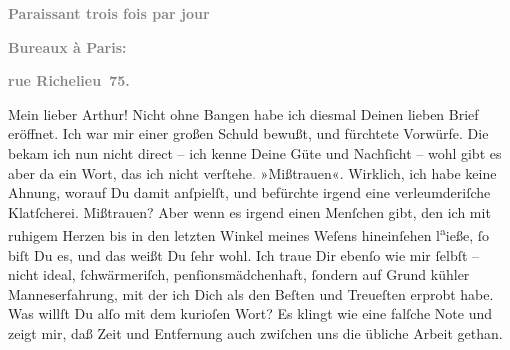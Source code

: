 \pstart
           \begin{otherlanguage}{french}\textcolor{gray}{\textbf{\textbf{Paraissant trois fois par jour}}}\end{otherlanguage}\pend
           
\pstart
           \begin{otherlanguage}{french}\textcolor{gray}{\textbf{\textbf{Bureaux à Paris:}}}\end{otherlanguage}\pend
           
\pstart
           \begin{otherlanguage}{french}\textcolor{gray}{\textbf{\textbf{rue Richelieu 75.}}}\end{otherlanguage}\pend
           
\pstart\center{}Mein lieber Arthur!\pend\vspace{0.5em}
\pstart
           Nicht ohne Bangen habe ich diesmal Deinen lieben Brief eröffnet. Ich war mir einer
               großen Schuld bewußt, und fürchtete Vorwürfe. Die bekam ich nun nicht direct – ich
               kenne Deine Güte und Nachſicht – wohl gibt es aber da ein Wort, das ich nicht
                  verſtehe\textcolor{gray}{.} »Mißtrauen«. Wirklich, ich habe keine Ahnung, worauf
               Du damit anſpielſt, und befürchte irgend eine verleumderiſche Klatſcherei. Mißtrauen?
               Aber wenn es irgend einen Menſchen gibt, den ich mit ruhigem Herzen bis in den
               letzten Winkel meines Weſens hineinſehen l\substVorne{}\textsuperscript{a}\substDazwischen{}ie\substHinten{}ße,{ }ſo {\pb}biſt Du es, und das weißt Du{ }ſehr
               wohl. Ich traue Dir ebenſo wie mir{ }ſelbſt – nicht ideal,{ }ſchwärmeriſch,
               penſionsmädchenhaft,{ }ſondern auf Grund kühler Manneserfahrung, mit der ich Dich als
               den Beſten und Treueſten erprobt habe. Was willſt Du alſo mit dem kurioſen Wort? Es
               klingt wie eine falſche Note und zeigt mir, daß Zeit und Entfernung auch zwiſchen uns
               die übliche Arbeit gethan.\pend
           
